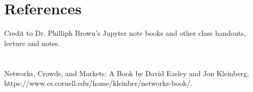 \documentclass[letterpaper]{article}
\begin{document}
\section{References}
Credit to Dr. Philliph Brown's Jupyter note books and other class handouts, lecture and notes.\\\\
\quad\\
Networks, Crowds, and Markets: A Book by David Easley and Jon Kleinberg, https://www.cs.cornell.edu/home/kleinber/networks-book/. 
\end{document}
